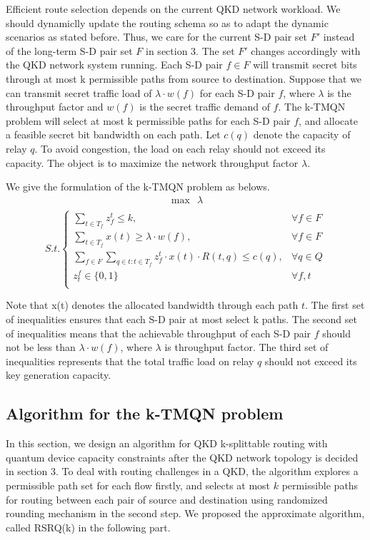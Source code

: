 Efficient route selection depends on the current QKD network workload. We should dynamiclly update the routing schema so as to adapt the dynamic scenarios as stated before. Thus, we care for the current S-D pair set $F'$ instead of the long-term S-D pair set $F$ in section 3. The set $F'$ changes accordingly with the QKD network system running. Each S-D pair $f \in F$ will transmit secret bits through at most k permissible paths from source to destination. Suppose that we can transmit secret traffic load of $\lambda \cdot w(f)$ for each S-D pair $f$, where $\lambda$ is the throughput factor and $w(f)$ is the secret traffic demand of $f$. The k-TMQN problem will select at most k permissible paths for each S-D pair $f$, and allocate a feasible secret bit bandwidth on each path. Let $c(q)$ denote the capacity of relay $q$. To avoid congestion, the load on each relay should not exceed its capacity. The object is to maximize the network throughput factor $\lambda$.

We give the formulation of the k-TMQN problem as belows.
\begin{equation*}
\begin{aligned}
\max \ \ \lambda \\
\end{aligned}
\end{equation*}
\begin{equation}\label{eq:throughputmax}
S.t.\begin{cases}
\sum_{t \in T_f}z_f^t \le k, & \forall f \in F \\
\sum_{t \in T_f} x(t) \ge \lambda \cdot w(f), & \forall f \in F \\
\sum_{f \in F}\sum_{q \in t:t \in T_f}{z_f^t \cdot x(t) \cdot R(t,q)} \le c(q), & \forall q \in Q \\
z^f_t \in \{0,1\} & \forall f,t\\


\end{cases}
\end{equation}

Note that x(t) denotes the allocated bandwidth through each path $t$. The first set of inequalities ensures that each S-D pair at most select k paths. The second set of inequalities means that the achievable throughput of each S-D pair $f$ should not be less than $\lambda \cdot w(f)$, where $\lambda$ is throughput factor. The third set of inequalities represents that the total traffic load on relay $q$ should not exceed its key generation capacity.
\subsection{Algorithm for the k-TMQN problem}
In this section, we design an algorithm for QKD k-splittable routing with quantum device capacity constraints after the QKD network topology is decided in section 3. To deal with routing challenges in a QKD, the algorithm explores a permissible path set for each flow firstly, and selects at most $k$ permissible paths for routing between each pair of source and destination using randomized rounding mechanism in the second step. We proposed the approximate algorithm, called RSRQ(k) in the following part. 


